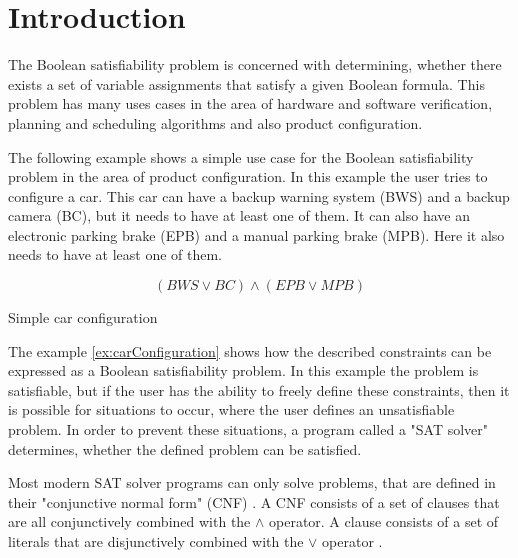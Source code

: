 
\chapter{Introduction}
\label{ch:Introduction}

The Boolean satisfiability problem is concerned with determining, whether there exists a set of variable assignments that satisfy a given Boolean formula. This problem has many uses cases in the area of hardware and software verification, planning and scheduling algorithms and also product configuration. \cite{biere2009handbook}

The following example shows a simple use case for the Boolean satisfiability problem in the area of product configuration. In this example the user tries to configure a car. This car can have a backup warning system (BWS) and a backup camera (BC), but it needs to have at least one of them. It can also have an electronic parking brake (EPB) and a manual parking brake (MPB). Here it also needs to have at least one of them.
\begin{example}
\begin{leftbar}
\begin{displaymath}
(BWS \vee BC) \wedge (EPB \vee MPB)
\end{displaymath}
\end{leftbar}
\caption{Simple car configuration}
\label{ex:carConfiguration}
\end{example}

The example \ref{ex:carConfiguration} shows how the described constraints can be expressed as a Boolean satisfiability problem. In this example the problem is satisfiable, but if the user has the ability to freely define these constraints, then it is possible for situations to occur, where the user defines an unsatisfiable problem. In order to prevent these situations, a program called a "SAT solver" determines, whether the defined problem can be satisfied.

Most modern SAT solver programs can only solve problems, that are defined in their "conjunctive normal form" (CNF) \cite{biere2009handbook}. A CNF consists of a set of clauses that are all conjunctively combined with the $\wedge$ operator. A clause consists of a set of literals that are disjunctively combined with the $\vee$ operator \cite{biere2009handbook}.

